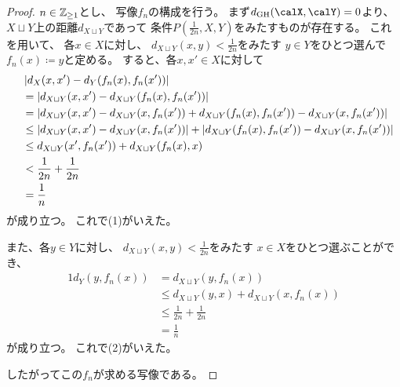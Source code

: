\documentclass[report, notitlepage]{jlreq}
\newcommand{\GH}{\mathrm{GH}}
\begin{document}
\begin{proof}
    $n \in \mathbb{Z}_{\ge 1}$とし、
    写像$f_n$の構成を行う。
    まず$d_\GH(\calX, \calY) = 0$より、
    $X \sqcup Y$上の距離$d_{X \sqcup Y}$であって
    条件$P(\tfrac{1}{2n}, X, Y)$をみたすものが存在する。
    これを用いて、
    各$x \in X$に対し、
    $d_{X \sqcup Y}(x, y) < \tfrac{1}{2n}$をみたす
    $y \in Y$をひとつ選んで
    $f_n(x) \coloneqq y$と定める。
    すると、各$x, x' \in X$に対して
    \begin{alignat}{1}
        \phantom{=}
            &\left|{
                d_X(x, x') - d_Y(f_n(x), f_n(x'))
            }\right|
            \\
        &=
            \left|{
                d_{X \sqcup Y}(x, x') - d_{X \sqcup Y}(f_n(x), f_n(x'))
            }\right|
            \\
        &=
            \left|{
                d_{X \sqcup Y}(x, x') - d_{X \sqcup Y}(x, f_n(x'))
                +
                d_{X \sqcup Y}(f_n(x), f_n(x')) - d_{X \sqcup Y}(x, f_n(x'))
            }\right|
            \\
        &\le
            \left|{
                d_{X \sqcup Y}(x, x') - d_{X \sqcup Y}(x, f_n(x'))
            }\right|
            +
            \left|{
                d_{X \sqcup Y}(f_n(x), f_n(x')) - d_{X \sqcup Y}(x, f_n(x'))
            }\right|
            \\
        &\le
            d_{X \sqcup Y}(x', f_n(x'))
            +
            d_{X \sqcup Y}(f_n(x), x)
            \\
        &<
            \frac{1}{2n} + \frac{1}{2n}
            \\
        &=
            \frac{1}{n}
    \end{alignat}
    が成り立つ。
    これで(1)がいえた。

    また、各$y \in Y$に対し、
    $d_{X \sqcup Y}(x, y) < \tfrac{1}{2n}$をみたす
    $x \in X$をひとつ選ぶことができ、
    \begin{alignat}{1}
        d_Y(y, f_n(x))
            &=
                d_{X \sqcup Y}(y, f_n(x))
                \\
            &\le
                d_{X \sqcup Y}(y, x)
                +
                d_{X \sqcup Y}(x, f_n(x))
                \\
            &\le
                \frac{1}{2n}
                +
                \frac{1}{2n}
                \\
            &=
                \frac{1}{n}
    \end{alignat}
    が成り立つ。
    これで(2)がいえた。

    したがってこの$f_n$が求める写像である。
\end{proof}
\end{document}
